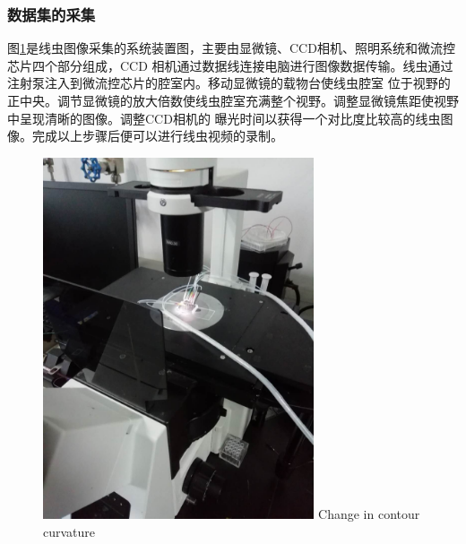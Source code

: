 \subsubsection{数据集的采集}
	图\ref{fig:chap5:camera}是线虫图像采集的系统装置图，主要由显微镜、CCD相机、照明系统和微流控芯片四个部分组成，CCD
	相机通过数据线连接电脑进行图像数据传输。线虫通过注射泵注入到微流控芯片的腔室内。移动显微镜的载物台使线虫腔室
	位于视野的正中央。调节显微镜的放大倍数使线虫腔室充满整个视野。调整显微镜焦距使视野中呈现清晰的图像。调整CCD相机的
	曝光时间以获得一个对比度比较高的线虫图像。完成以上步骤后便可以进行线虫视频的录制。
	\begin{figure}[thb]
	  \centering
	  \includegraphics[width=8cm]{figure/chap5/camera.jpg}
		{Change in contour curvature}
	  \label{fig:chap5:camera}
	\end{figure}
